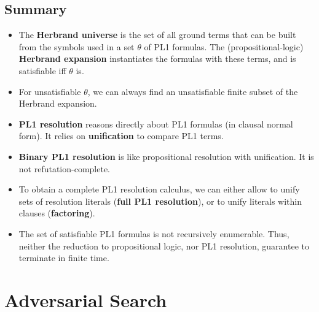 \documentclass[conference]{styles/acmsiggraph}
\begin{document}
    \subsection{Summary}
        \begin{itemize}
            \item The \textbf{Herbrand universe} is the set of all ground terms that can be built from the symbols used in a set $\theta$ of PL1 formulas. 
                The (propositional-logic) \textbf{Herbrand expansion} instantiates the formulas with these terms, and is satisfiable iff $\theta$ is.
            \item For unsatisfiable $\theta$, we can always find an unsatisfiable finite subset of the Herbrand expansion.
            \item \textbf{PL1 resolution} reasons directly about PL1 formulas (in clausal normal form).
                It relies on \textbf{unification} to compare PL1 terms.
            \item \textbf{Binary PL1 resolution} is like propositional resolution with unification. 
                It is not refutation-complete.
            \item To obtain a complete PL1 resolution calculus, we can either allow to unify sets of resolution literals (\textbf{full PL1 resolution}), or to unify literals within clauses (\textbf{factoring}).
            \item The set of satisfiable PL1 formulas is not recursively enumerable. 
                Thus, neither the reduction to propositional logic, nor PL1 resolution, guarantee to terminate in finite time.
        \end{itemize}

        
    
    
    
    
    
    
    



\section{Adversarial Search}
\end{document}
